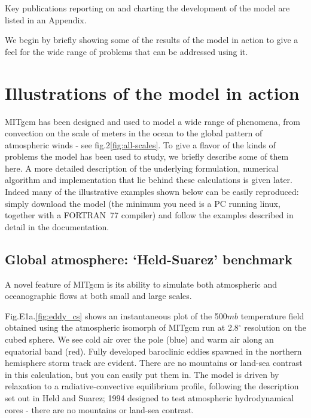 \documentclass[12pt]{book}
\begin{document}
Key publications reporting on and charting the development of the model are
listed in an Appendix.

We begin by briefly showing some of the results of the model in action to
give a feel for the wide range of problems that can be addressed using it.


\section{Illustrations of the model in action}

MITgcm has been designed and used to model a wide range of phenomena,
from convection on the scale of meters in the ocean to the global pattern of
atmospheric winds - see fig.2\ref{fig:all-scales}. To give a flavor of the
kinds of problems the model has been used to study, we briefly describe some
of them here. A more detailed description of the underlying formulation,
numerical algorithm and implementation that lie behind these calculations is
given later. Indeed many of the illustrative examples shown below can be
easily reproduced: simply download the model (the minimum you need is a PC
running linux, together with a FORTRAN\ 77 compiler) and follow the examples
described in detail in the documentation.

\subsection{Global atmosphere: `Held-Suarez' benchmark}

A novel feature of MITgcm is its ability to simulate both atmospheric and
oceanographic flows at both small and large scales.

Fig.E1a.\ref{fig:eddy_cs} shows an instantaneous plot of the 500$mb$
temperature field obtained using the atmospheric isomorph of MITgcm run at
2.8$^{\circ }$ resolution on the cubed sphere. We see cold air over the pole
(blue) and warm air along an equatorial band (red). Fully developed
baroclinic eddies spawned in the northern hemisphere storm track are
evident. There are no mountains or land-sea contrast in this calculation,
but you can easily put them in. The model is driven by relaxation to a
radiative-convective equilibrium profile, following the description set out
in Held and Suarez; 1994 designed to test atmospheric hydrodynamical cores -
there are no mountains or land-sea contrast.
\end{document}
